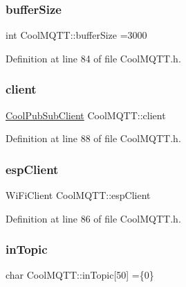 \subsubsection{\texorpdfstring{buffer\+Size}{bufferSize}}
{\footnotesize\ttfamily int Cool\+M\+Q\+T\+T\+::buffer\+Size =3000\hspace{0.3cm}{\ttfamily [private]}}



Definition at line 84 of file Cool\+M\+Q\+T\+T.\+h.

\mbox{\label{class_cool_m_q_t_t_afed1372683c44893b4668d0f1771f514}} 
\subsubsection{\texorpdfstring{client}{client}}
{\footnotesize\ttfamily \hyperlink{class_cool_pub_sub_client}{Cool\+Pub\+Sub\+Client} Cool\+M\+Q\+T\+T\+::client\hspace{0.3cm}{\ttfamily [private]}}



Definition at line 88 of file Cool\+M\+Q\+T\+T.\+h.

\mbox{\label{class_cool_m_q_t_t_acc30a0200967374a524092a8a806502a}} 
\subsubsection{\texorpdfstring{esp\+Client}{espClient}}
{\footnotesize\ttfamily Wi\+Fi\+Client Cool\+M\+Q\+T\+T\+::esp\+Client\hspace{0.3cm}{\ttfamily [private]}}



Definition at line 86 of file Cool\+M\+Q\+T\+T.\+h.

\mbox{\label{class_cool_m_q_t_t_a4492f52a441e83cc5151010317fdb52d}} 
\subsubsection{\texorpdfstring{in\+Topic}{inTopic}}
{\footnotesize\ttfamily char Cool\+M\+Q\+T\+T\+::in\+Topic\mbox{[}50\mbox{]} =\{\textquotesingle{}0\textquotesingle{}\}\hspace{0.3cm}{\ttfamily [private]}}



